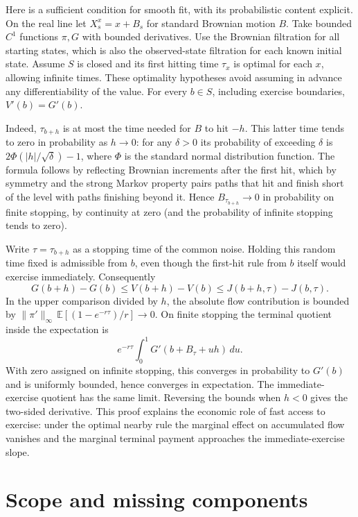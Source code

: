 \documentclass[11pt]{article}
\begin{document}
Here is a sufficient condition for smooth fit, with its probabilistic content explicit. On the real line let \(X_s^x=x+B_s\) for standard Brownian motion \(B\). Take bounded \(C^1\) functions \(\pi,G\) with bounded derivatives. Use the Brownian filtration for all starting states, which is also the observed-state filtration for each known initial state. Assume \(S\) is closed and its first hitting time \(\tau_x\) is optimal for each \(x\), allowing infinite times. These optimality hypotheses avoid assuming in advance any differentiability of the value. For every \(b\in S\), including exercise boundaries, \(V'(b)=G'(b)\).

Indeed, \(\tau_{b+h}\) is at most the time needed for \(B\) to hit \(-h\). This latter time tends to zero in probability as \(h\to0\): for any \(\delta>0\) its probability of exceeding \(\delta\) is \(2\Phi(|h|/\sqrt{\delta})-1\), where \(\Phi\) is the standard normal distribution function. The formula follows by reflecting Brownian increments after the first hit, which by symmetry and the strong Markov property pairs paths that hit and finish short of the level with paths finishing beyond it. Hence \(B_{\tau_{b+h}}\to0\) in probability on finite stopping, by continuity at zero (and the probability of infinite stopping tends to zero).

Write \(\tau=\tau_{b+h}\) as a stopping time of the common noise. Holding this random time fixed is admissible from \(b\), even though the first-hit rule from \(b\) itself would exercise immediately. Consequently
\[
 G(b+h)-G(b)\leq V(b+h)-V(b)\leq J(b+h,\tau)-J(b,\tau).
\]
In the upper comparison divided by \(h\), the absolute flow contribution is bounded by
\(\|\pi'\|_\infty\,\mathbb E[(1-e^{-r\tau})/r]\to0\).
On finite stopping the terminal quotient inside the expectation is
\[
 e^{-r\tau}\int_0^1 G'(b+B_\tau+uh)\,du .
\]
With zero assigned on infinite stopping, this converges in probability to \(G'(b)\) and is uniformly bounded, hence converges in expectation. The immediate-exercise quotient has the same limit. Reversing the bounds when \(h<0\) gives the two-sided derivative. This proof explains the economic role of fast access to exercise: under the optimal nearby rule the marginal effect on accumulated flow vanishes and the marginal terminal payment approaches the immediate-exercise slope.

\section{Scope and missing components}
\end{document}

